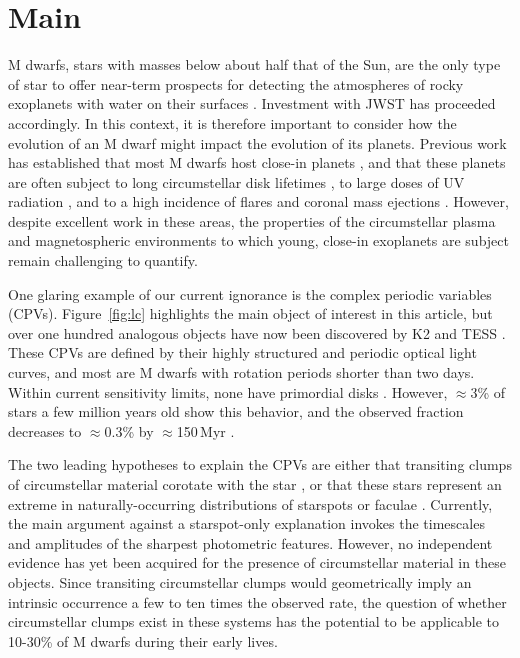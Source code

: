 \documentclass{nature3}
\begin{document}

\section{Main}
\label{sec:main}

M dwarfs, stars with masses below about half that of the Sun, are the
only type of star to offer near-term prospects for detecting the
atmospheres of rocky exoplanets with water on their surfaces
\cite{NAP26141}.  Investment with JWST has proceeded accordingly.  In
this context, it is therefore important to consider how the evolution
of an M dwarf might impact the evolution of its planets.  Previous
work has established that most M dwarfs host close-in planets
\cite{Dressing2015}, and that these planets are often subject to long
circumstellar disk lifetimes \cite{Ribas2015}, to large doses of UV
radiation \cite{France2013}, and to a high incidence of flares and
coronal mass ejections \cite{Gunther2020}.  However, despite excellent
work in these areas, the properties of the circumstellar plasma and
magnetospheric environments to which young, close-in exoplanets are
subject remain challenging to quantify. 

One glaring example of our current ignorance is the complex periodic
variables (CPVs).  Figure~\ref{fig:lc} highlights the main object of
interest in this article, but over one hundred analogous objects have
now been discovered by K2 and TESS 
\cite{Rebull2016,Stauffer2017,Rebull2018,Zhan2019,Rebull2020,Bouma2024}.
These CPVs are
defined by their highly structured and periodic optical light curves, 
and most are M dwarfs with rotation periods shorter than two days.
Within current sensitivity limits, none have primordial disks
\cite{Stauffer2017,Bouma2024}.
However, $\approx$3\% of stars a few million years old show this
behavior, and the observed fraction decreases to $\approx$0.3\%
by $\approx$150\,Myr \cite{Rebull2020}.

The two leading hypotheses to explain the CPVs are either that
transiting clumps of circumstellar material corotate with the star
\cite{Stauffer2017,Gunther2022,Bouma2024}, or that these stars
represent an extreme in naturally-occurring distributions of starspots
or faculae \cite{Koen2021}.  Currently, the main argument against a
starspot-only explanation invokes the timescales and amplitudes of the
sharpest photometric features.  However, no independent evidence has
yet been acquired for the presence of circumstellar material in these
objects.  Since transiting circumstellar clumps would geometrically
imply an intrinsic occurrence a few to ten times the observed rate,
the question of whether circumstellar clumps exist in these systems
has the potential to be applicable to 10-30\% of M dwarfs during their
early lives.
\end{document}
